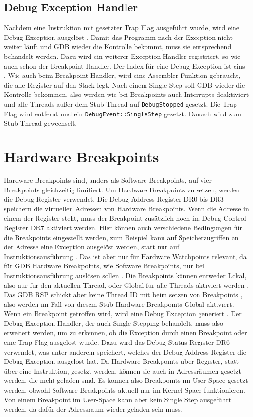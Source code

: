 \subsection{Debug Exception Handler}
Nachdem eine Instruktion mit gesetzter Trap Flag ausgeführt wurde, wird eine Debug Exception ausgelöst \cite{intel-sdm}. Damit das Programm nach der Exception nicht weiter läuft und GDB wieder die Kontrolle bekommt, muss sie entsprechend behandelt werden. Dazu wird ein weiterer Exception Handler registriert, so wie auch schon der Breakpoint Handler. Der Index für eine Debug Exception ist eins \cite{intel-sdm}. Wie auch beim Breakpoint Handler, wird eine Assembler Funktion gebraucht, die alle Register auf den Stack legt. Nach einem Single Step soll GDB wieder die Kontrolle bekommen, also werden wie bei Breakpoints auch Interrupts deaktiviert und alle Threads außer dem Stub-Thread auf \texttt{DebugStopped} gesetzt. Die Trap Flag wird entfernt und ein \texttt{DebugEvent::SingleStep} gesetzt. Danach wird zum Stub-Thread gewechselt.

\section{Hardware Breakpoints}
Hardware Breakpoints sind, anders als Software Breakpoints, auf vier Breakpoints gleichzeitig limitiert. Um Hardware Breakpoints zu setzen, werden die Debug Register verwendet. Die Debug Address Register DR0 bis DR3 speichern die virtuellen Adressen von Hardware Breakpoints. Wenn die Adresse in einem der Register steht, muss der Breakpoint zusätzlich noch im Debug Control Register DR7 aktiviert werden. Hier können auch verschiedene Bedingungen für die Breakpoints eingestellt werden, zum Beispiel kann auf Speicherzugriffen an der Adresse eine Exception ausgelöst werden, statt nur auf Instruktionsausführung \cite{intel-sdm}. Das ist aber nur für Hardware Watchpoints relevant, da für GDB Hardware Breakpoints, wie Software Breakpoints, nur bei Instruktionsausführung auslösen sollen \cite{gdb}. Die Breakpoints können entweder Lokal, also nur für den aktuellen Thread, oder Global für alle Threads aktiviert werden \cite{intel-sdm}. Das GDB RSP schickt aber keine Thread ID mit beim setzen von Breakpoints \cite{gdb}, also werden im Fall von diesem Stub Hardware Breakpoints Global aktiviert. Wenn ein Breakpoint getroffen wird, wird eine Debug Exception generiert \cite{intel-sdm}. Der Debug Exception Handler, der auch Single Stepping behandelt, muss also erweitert werden, um zu erkennen, ob die Exception durch einen Breakpoint oder eine Trap Flag ausgelöst wurde. Dazu wird das Debug Status Register DR6 verwendet, was unter anderem speichert, welches der Debug Address Register die Debug Exception ausgelöst hat. Da Hardware Breakpoints über Register, statt über eine Instruktion, gesetzt werden, können sie auch in Adressräumen gesetzt werden, die nicht geladen sind. Es können also Breakpoints im User-Space gesetzt werden, obwohl Software Breakpoints aktuell nur im Kernel-Space funktionieren. Von einem Breakpoint im User-Space kann aber kein Single Step ausgeführt werden, da dafür der Adressraum wieder geladen sein muss.

